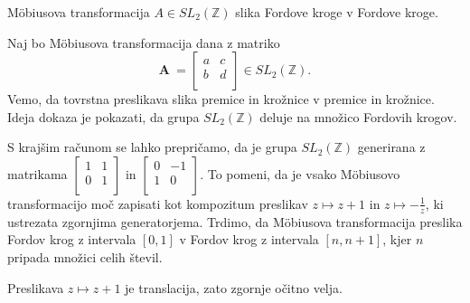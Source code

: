 \documentclass[mat1]{fmfdelo}
\begin{document}
\begin{izrek}
\label{izr:MobDelovanje}
M\"{o}biusova transformacija $A \in {SL}_{2}(\mathbb{Z})$ slika Fordove kroge v Fordove kroge.
\end{izrek}

\begin{dokaz}
Naj bo M\"{o}biusova transformacija dana z matriko 
\[
\mathbf{A}\ =
\left[
\begin{array}{cc}
a & c \\
b & d \\
\end{array}
\right]
\in {SL}_{2}(\mathbb{Z}).
\]
Vemo, da tovrstna preslikava slika premice in krožnice v premice in krožnice. Ideja dokaza je pokazati, da grupa ${SL}_{2}(\mathbb{Z})$ deluje na množico Fordovih krogov.

S krajšim računom se lahko prepričamo, da je grupa ${SL}_{2}(\mathbb{Z})$ generirana z matrikama 
\(
\left[
\begin{array}{cc}
1 & 1 \\
0 & 1 \\
\end{array}
\right]
\)
in
\(
\left[
\begin{array}{cc}
0 & -1 \\
1 & 0 \\
\end{array}
\right]
\).
To pomeni, da je vsako M\"{o}biusovo transformacijo moč zapisati kot kompozitum preslikav $z \mapsto z+1$ in $z \mapsto -\frac{1}{z}$, ki ustrezata zgornjima generatorjema. Trdimo, da M\"{o}biusova transformacija preslika Fordov krog z intervala $ [0,1]$ v Fordov krog z intervala $[n,n+1]$, kjer $n$ pripada množici celih števil. 

Preslikava $z \mapsto z+1$ je translacija, zato zgornje očitno velja.


\end{dokaz}
\end{document}

